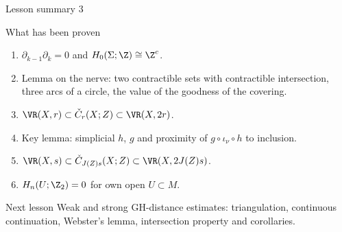 \documentclass[aspectratio=169,11pt]{beamer}
\begin{document}
\begin{frame}{Lesson summary \textup{3}}
\begin{block}{What has been proven}
\begin{enumerate}
\item $\partial_{k-1}\partial_k = 0$ and $H_0(\Sigma;\Z) \cong \Z^{c}$.
\item Lemma on the nerve\textup{:} two contractible sets with contractible intersection, three arcs of a circle, the value of the goodness of the covering.
\item $\VR(X,r) \subset \check C_r(X;Z) \subset \VR(X,2r)$.
\item Key lemma\textup{:} simplicial $h$, $g$ and proximity of $g \circ \iota_\nu \circ h$ to inclusion.
\item $\VR(X,s) \subset \check C_{J(Z)s}(X;Z) \subset \VR(X, 2J(Z)s)$.
\item $H_n(U;\Z_2) = 0$ for own open $U \subset M$.
\end{enumerate}
\end{block}
\begin{block}{Next lesson}
Weak and strong GH-distance estimates\textup{:} triangulation, continuous continuation, Webster's lemma, intersection property and corollaries.
\end{block}
\end{frame}
\end{document}
